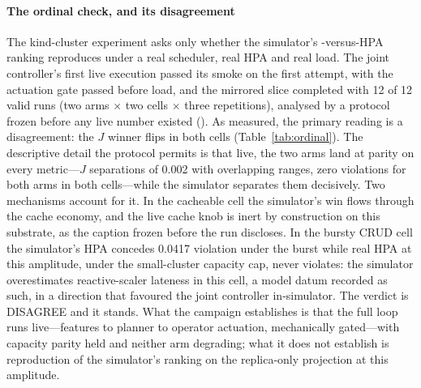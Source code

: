 \paragraph{The ordinal check, and its disagreement} The kind-cluster
experiment asks only whether the simulator's \jcac{}-versus-HPA ranking
reproduces under a real scheduler, real HPA and real load. The joint
controller's first live execution passed its smoke on the first attempt,
with the actuation gate passed before load, and the mirrored slice
completed with 12 of 12 valid runs (two arms $\times$ two cells $\times$
three repetitions), analysed by a protocol frozen before any live number
existed (). As measured, the primary reading is
a disagreement: the $J$ winner flips in both cells
(Table~\ref{tab:ordinal}). The descriptive detail the protocol permits is
that live, the two arms land at parity on every metric---$J$ separations
of 0.002 with overlapping ranges, zero violations for both arms in both
cells---while the simulator separates them decisively. Two mechanisms
account for it. In the cacheable cell the simulator's win flows through the
cache economy, and the live cache knob is inert by construction on this
substrate, as the caption frozen before the run discloses. In the bursty
CRUD cell the simulator's HPA concedes 0.0417 violation under the burst
while real HPA at this amplitude, under the small-cluster capacity cap,
never violates: the simulator overestimates reactive-scaler lateness in
this cell, a model datum recorded as such, in a direction that favoured
the joint controller in-simulator. The verdict is DISAGREE and it stands.
What the campaign establishes is that the full loop runs live---features
to planner to operator actuation, mechanically gated---with capacity
parity held and neither arm degrading; what it does not establish is
reproduction of the simulator's ranking on the replica-only projection at
this amplitude.

